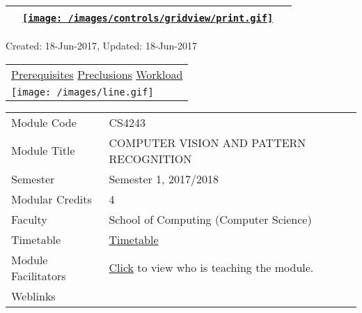 \hypertarget{ctl00_ctl00_ContentPlaceHolder1_ContentPlaceHolder1_UP}{}
\hypertarget{contentstart}{}
\hypertarget{ctl00_ctl00_ContentPlaceHolder1_ContentPlaceHolder1_pnlMain}{}
\begin{longtable}[]{@{}ll@{}}
\toprule
&
{\href{javascript:PrintThisPage();}{\texttt{[image: /images/controls/gridview/print.gif]}}~~}\tabularnewline
\bottomrule
\end{longtable}

\protect\hypertarget{ctl00_ctl00_ContentPlaceHolder1_ContentPlaceHolder1_LV_UpdateInfo_ctrl0_txtDate}{}{Created:
18-Jun-2017, Updated: 18-Jun-2017}

\begin{longtable}[]{@{}l@{}}
\toprule
\protect\hypertarget{ctl00_ctl00_ContentPlaceHolder1_ContentPlaceHolder1_lblSectionTop}{}{\protect\hyperlink{Prerequisites}{Prerequisites}
\textbar{} \protect\hyperlink{Preclusions}{Preclusions} \textbar{}
\protect\hyperlink{Workload}{Workload}}\tabularnewline
\texttt{[image: /images/line.gif]}\tabularnewline
\bottomrule
\end{longtable}

\hypertarget{ctl00_ctl00_ContentPlaceHolder1_ContentPlaceHolder1_LV_itemPlaceholderContainer}{}
\begin{longtable}[]{@{}ll@{}}
\toprule
\protect\hypertarget{ctl00_ctl00_ContentPlaceHolder1_ContentPlaceHolder1_LV_ctrl0_txtCode}{}{Module
Code} &
\protect\hypertarget{ctl00_ctl00_ContentPlaceHolder1_ContentPlaceHolder1_LV_ctrl0_lcCode}{}{CS4243}\tabularnewline
\protect\hypertarget{ctl00_ctl00_ContentPlaceHolder1_ContentPlaceHolder1_LV_ctrl0_lcCourse}{}{Module
Title} &
\protect\hypertarget{ctl00_ctl00_ContentPlaceHolder1_ContentPlaceHolder1_LV_ctrl0_lcCourseName}{}{COMPUTER
VISION AND PATTERN RECOGNITION}\tabularnewline
\protect\hypertarget{ctl00_ctl00_ContentPlaceHolder1_ContentPlaceHolder1_LV_ctrl0_lcSemester}{}{Semester}
&
\protect\hypertarget{ctl00_ctl00_ContentPlaceHolder1_ContentPlaceHolder1_LV_ctrl0_lcSem}{}{Semester
1, 2017/2018}\tabularnewline
\protect\hypertarget{ctl00_ctl00_ContentPlaceHolder1_ContentPlaceHolder1_LV_ctrl0_lcModCredit}{}{Modular
Credits} &
\protect\hypertarget{ctl00_ctl00_ContentPlaceHolder1_ContentPlaceHolder1_LV_ctrl0_lcModC}{}{4}\tabularnewline
\protect\hypertarget{ctl00_ctl00_ContentPlaceHolder1_ContentPlaceHolder1_LV_ctrl0_lcFaculty}{}{Faculty}
&
\protect\hypertarget{ctl00_ctl00_ContentPlaceHolder1_ContentPlaceHolder1_LV_ctrl0_lcFac}{}{School
of Computing (Computer Science)}\tabularnewline
\protect\hypertarget{ctl00_ctl00_ContentPlaceHolder1_ContentPlaceHolder1_LV_ctrl0_Label1}{}{Timetable}
&
\protect\hypertarget{ctl00_ctl00_ContentPlaceHolder1_ContentPlaceHolder1_LV_ctrl0_Span1}{}{\href{javascript:void(0);}{Timetable}}\tabularnewline
\protect\hypertarget{ctl00_ctl00_ContentPlaceHolder1_ContentPlaceHolder1_LV_ctrl0_Label6}{}{Module
Facilitators} &
\protect\hypertarget{ctl00_ctl00_ContentPlaceHolder1_ContentPlaceHolder1_LV_ctrl0_Span2}{}{\href{list_lecturers.aspx?CourseID=29e8cc71-78dd-4928-b08c-cb4ffd1caae9\&ClickFrom=}{Click}
to view who is teaching the module.}\tabularnewline
\protect\hypertarget{ctl00_ctl00_ContentPlaceHolder1_ContentPlaceHolder1_LV_ctrl0_LabelCtrl1}{}{Weblinks}
&\tabularnewline
\bottomrule
\end{longtable}

